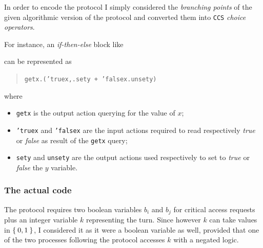 \documentclass[10pt,a4paper]{article}
\newcommand{\CCS}{{\tt CCS}}
\newcommand{\CCSCode}[1]{{\tt #1}}
\begin{document}
            In order to encode the protocol I simply considered the
            \emph{branching points} of the given algorithmic version of
            the protocol and converted them into \CCS{} \emph{choice
            operators}.

            \noindent For instance, an \emph{if-then-else} block like
            \begin{quote}
                \begin{algorithm}[H]
                \end{algorithm}
            \end{quote}
            can be represented as
            \begin{quote}
            \CCSCode{getx.('truex,.sety + 'falsex.unsety)}
            \end{quote}
            where
            \begin{itemize}

            \item   \CCSCode{getx} is the output action querying for the
                    value of $x$;

            \item   \CCSCode{'truex} and \CCSCode{'falsex} are the input
                    actions required to read respectively \emph{true} or
                    \emph{false} as result of the \CCSCode{getx} query;

            \item   \CCSCode{sety} and \CCSCode{unsety} are the output
                    actions used respectively to set to \emph{true} or
                    \emph{false} the $y$ variable.

            \end{itemize}

        \subsubsection{The actual code}
        \label{subsub:ActualCode}

            The protocol requires two boolean variables $b_i$ and $b_j$
            for critical access requests plus an integer variable $k$
            representing the turn. Since however $k$ can take values in
            $\Set{0, 1}$, I considered it as it were a boolean variable as
            well, provided that one of the two processes following the
            protocol accesses $k$ with a negated logic.
\end{document}
